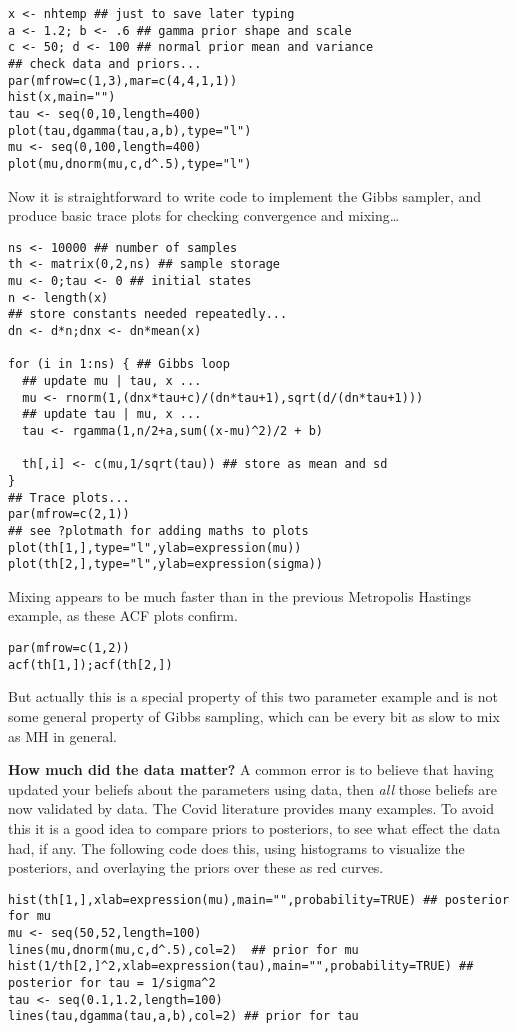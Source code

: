 \documentclass[10pt] {article}
\newcommand{\eps}[3]
{{\begin{center}
 \rotatebox{#1}{\scalebox{#2}{\texttt{[image: \#3]}}}
 \end{center}}
}
\theoremstyle{definition}
\begin{document}
\begin{lstlisting}
x <- nhtemp ## just to save later typing
a <- 1.2; b <- .6 ## gamma prior shape and scale
c <- 50; d <- 100 ## normal prior mean and variance
## check data and priors...
par(mfrow=c(1,3),mar=c(4,4,1,1))
hist(x,main="")
tau <- seq(0,10,length=400)
plot(tau,dgamma(tau,a,b),type="l")
mu <- seq(0,100,length=400)
plot(mu,dnorm(mu,c,d^.5),type="l")
\end{lstlisting}
\eps{-90}{.8}{check-prior.eps}
Now it is straightforward to write code to implement the Gibbs sampler, and produce basic trace plots for checking convergence and mixing\ldots 
\begin{lstlisting}
ns <- 10000 ## number of samples
th <- matrix(0,2,ns) ## sample storage
mu <- 0;tau <- 0 ## initial states
n <- length(x) 
## store constants needed repeatedly...
dn <- d*n;dnx <- dn*mean(x) 

for (i in 1:ns) { ## Gibbs loop
  ## update mu | tau, x ... 
  mu <- rnorm(1,(dnx*tau+c)/(dn*tau+1),sqrt(d/(dn*tau+1)))
  ## update tau | mu, x ... 
  tau <- rgamma(1,n/2+a,sum((x-mu)^2)/2 + b)
  
  th[,i] <- c(mu,1/sqrt(tau)) ## store as mean and sd
}
## Trace plots...
par(mfrow=c(2,1))
## see ?plotmath for adding maths to plots
plot(th[1,],type="l",ylab=expression(mu))
plot(th[2,],type="l",ylab=expression(sigma))
\end{lstlisting}
\eps{-90}{.5}{nh-trace.eps}
\noindent Mixing appears to be  much faster than in the previous Metropolis Hastings example, as these ACF plots confirm.
\begin{lstlisting}
par(mfrow=c(1,2))
acf(th[1,]);acf(th[2,])
\end{lstlisting}

\vspace*{-1cm}

\eps{-90}{.4}{nh-acf.eps}
\noindent But actually this is a special property of this two parameter example and is not some general property of Gibbs sampling, which can be every bit as slow to mix as MH in general. 

{\bf How much did the data matter?} A common error is to believe that having updated your beliefs about the parameters using data, then {\em all} those beliefs are now validated by data. The Covid literature provides many examples. To avoid this it is a good idea to compare priors to posteriors, to see what effect the data had, if any. The following code does this, using histograms to visualize the posteriors, and overlaying the priors over these as red curves. 
\begin{lstlisting}
hist(th[1,],xlab=expression(mu),main="",probability=TRUE) ## posterior for mu
mu <- seq(50,52,length=100)
lines(mu,dnorm(mu,c,d^.5),col=2)  ## prior for mu
hist(1/th[2,]^2,xlab=expression(tau),main="",probability=TRUE) ## posterior for tau = 1/sigma^2
tau <- seq(0.1,1.2,length=100) 
lines(tau,dgamma(tau,a,b),col=2) ## prior for tau 
\end{lstlisting}
\vspace*{-1cm}
\eps{-90}{.5}{nh-popr.eps}
\end{document}
